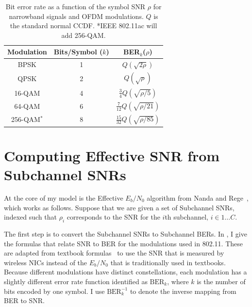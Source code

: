 
\begin{table}
\centering
\begin{tabular}{ccc}
\toprule
Modulation & Bits/Symbol ($k$) & BER$_k$($\rho$) \\
\midrule BPSK & 1 & $Q\left(\sqrt{2\rho}\right)$ \\
QPSK & 2 & $Q\left(\sqrt{\rho}\right)$\\
16-QAM & 4 & $\frac{3}{4}Q\left(\sqrt{\rho/5}\right)$\\
64-QAM & 6 & $\frac{7}{12}Q\left(\sqrt{\rho/21}\right)$\\
256-QAM$^*$ & 8 & $\frac{15}{32}Q\left(\sqrt{\rho/85}\right)$\\
\bottomrule
\end{tabular}
\caption[Bit error rate as a function of the symbol SNR for OFDM modulations]{\label{tab:ber_snr}Bit error rate as a function of the symbol SNR $\rho$ for narrowband signals and OFDM modulations. $Q$ is the standard normal CCDF. *IEEE 802.11ac will add 256-QAM.}
\end{table}

\section{Computing Effective SNR from Subchannel SNRs}
At the core of my model is the Effective $E_b/N_0$ algorithm from Nanda and Rege~\cite{Nanda_EffectiveSNR}, which works as follows. Suppose that we are given a set of Subchannel SNRs, indexed such that $\rho_i$ corresponds to the SNR for the $i$th subchannel, $i\in1\dots C$.

The first step is to convert the Subchannel SNRs to Subchannel BERs. In , I give the formulas that relate SNR to BER for the modulations used in 802.11. These are adapted from textbook formulas~\cite[\S3.7.1 and \S7.9.3.1]{Sklar} to use the SNR that is measured by wireless NICs instead of the $E_b/N_0$ that is traditionally used in textbooks. Because different modulations have distinct constellations, each modulation has a slightly different error rate function identified as $\text{BER}_k$, where $k$ is the number of bits encoded by one symbol. I use $\text{BER}_k^{-1}$ to denote the inverse mapping from BER to SNR.


